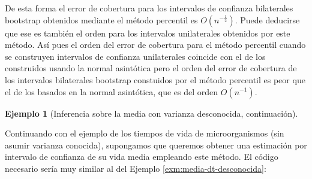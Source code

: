 \documentclass[
]{book}
\theoremstyle{break}
\theoremstyle{definition}
\theoremstyle{definition}
\newtheorem{example}{Ejemplo}[chapter]
\theoremstyle{definition}
\theoremstyle{remark}
\begin{document}
De esta forma el error de cobertura para los intervalos de confianza
bilaterales bootstrap obtenidos mediante el método percentil es \(O\left( n^{-\frac{1}{2}} \right)\). Puede deducirse que ese es también el orden
para los intervalos unilaterales obtenidos por este método. Así pues el
orden del error de cobertura para el método percentil cuando se
construyen intervalos de confianza unilaterales coincide con el de los
construidos usando la normal asintótica pero el orden del error de
cobertura de los intervalos bilaterales bootstrap constuidos por el
método percentil es peor que el de los basados en la normal asintótica,
que es del orden \(O\left( n^{-1} \right)\).

\begin{example}[Inferencia sobre la media con varianza desconocida, continuación]
\protect\hypertarget{exm:media-dt-desconocida-perc}{}{\label{exm:media-dt-desconocida-perc} \iffalse (Inferencia sobre la media con varianza desconocida, continuación) \fi{} } \vspace{0.5cm}

Continuando con el ejemplo de los tiempos de vida de microorganismos
(sin asumir varianza conocida),
supongamos que queremos obtener una estimación por intervalo de confianza
de su vida media empleando este método.
El código necesario sería muy similar al del Ejemplo \ref{exm:media-dt-desconocida}:
\end{example}
\end{document}
